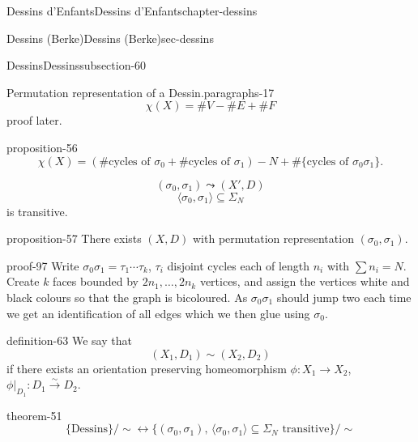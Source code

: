 \documentclass[oneside,10pt,]{book}
\numberwithin{equation}{section}
\begin{document}
\begin{chapterptx}{Dessins d'Enfants}{}{Dessins d'Enfants}{}{}{chapter-dessins}
\begin{sectionptx}{Dessins (Berke)}{}{Dessins (Berke)}{}{}{sec-dessins}
\begin{subsectionptx}{Dessins}{}{Dessins}{}{}{subsection-60}
\begin{paragraphs}{Permutation representation of a Dessin.}{paragraphs-17}
\begin{equation*}
\chi (X) = \#V -  \#E  + \#F
\end{equation*}
proof later.%
\begin{proposition}{}{}{proposition-56}%
\hypertarget{p-647}{}%
%
\begin{equation*}
\chi(X) = (\#\text{cycles of }\sigma_0+\#\text{cycles of }\sigma_1) - N + \#\{\text{cycles of }\sigma_0\sigma_1\}\text{.}
\end{equation*}
%
\end{proposition}
\hypertarget{p-648}{}%
%
\begin{equation*}
(\sigma_0, \sigma_1) \leadsto (X',D)
\end{equation*}
%
\begin{equation*}
\langle \sigma_0, \sigma_1 \rangle \subseteq \Sigma_N
\end{equation*}
is transitive.%
\begin{proposition}{}{}{proposition-57}%
\hypertarget{p-649}{}%
There exists \((X,D)\) with permutation representation \((\sigma_0, \sigma_1)\).%
\end{proposition}
\begin{proofptx}{}{proof-97}
\hypertarget{p-650}{}%
Write \(\sigma_0\sigma_1 = \tau_1 \cdots \tau_k\), \(\tau_i\) disjoint cycles each of length \(n_i\) with \(\sum n_i = N\). Create \(k\) faces bounded by \(2n_1, \ldots, 2n_k\) vertices, and assign the vertices white and black colours so that the graph is bicoloured. As \(\sigma_0\sigma_1\) should jump two each time we get an identification of all edges which we then  glue using \(\sigma_0\).%
\end{proofptx}
\begin{definition}{}{definition-63}%
\hypertarget{p-651}{}%
We say that%
\begin{equation*}
(X_1, D_1) \sim (X_2, D_2)
\end{equation*}
if there exists an orientation preserving homeomorphism \(\phi \colon X_1 \to X_2\), \(\phi|_{D_1} \colon D_1 \xrightarrow\sim D_2\).%
\end{definition}
\begin{theorem}{}{}{theorem-51}%
\hypertarget{p-652}{}%
%
\begin{equation*}
\{\text{Dessins}\}/\sim \leftrightarrow \{( \sigma_0, \sigma_1),\,\langle \sigma_0, \sigma_1 \rangle \subseteq \Sigma_N \text{ transitive}\}/\sim
\end{equation*}
%
\end{theorem}
\end{paragraphs}%
\end{subsectionptx}

\end{sectionptx}
\end{chapterptx}
\end{document}
